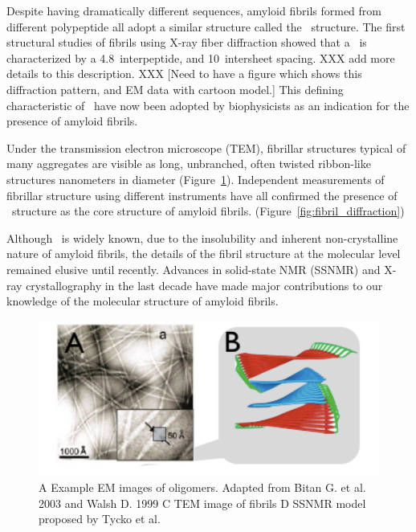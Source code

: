 
Despite having dramatically different sequences, amyloid fibrils formed from different polypeptide all adopt a similar structure called the \crossb\ structure.  The first structural studies of fibrils using X-ray fiber diffraction showed that a \crossb\ is characterized by a 4.8\angstrom\ interpeptide, and 10\angstrom\ intersheet spacing. XXX add more details to this description. XXX [Need to have a figure which shows this diffraction pattern, and EM data with cartoon model.] This defining characteristic of \crossb\ have now been adopted by biophysicists as an indication for the presence of amyloid fibrils.


Under the transmission electron microscope (TEM), fibrillar structures typical of many aggregates are visible as long, unbranched, often twisted ribbon-like structures nanometers in diameter (Figure~\ref{fig:fibril_TEM_SSNMR}). Independent measurements of fibrillar structure using different instruments have all confirmed the presence of \crossb\ structure as the core structure of amyloid fibrils. (Figure~\ref{fig:fibril_diffraction})


Although \crossb\ is widely known, due to the insolubility and inherent non-crystalline nature of amyloid fibrils, the details of the fibril structure at the molecular level remained elusive until recently. Advances in solid-state NMR (SSNMR) and X-ray crystallography in the last decade have made major contributions to our knowledge of the molecular structure of amyloid fibrils.

\begin{figure}
  \centering
  \includegraphics[width=6in]{figures/introduction/fibril_TEM_SSNMR.pdf}
  \caption[Characteristic cross-$\beta$ spacings from X-ray fibre diffraction studies of amyloid fibrils]{A Example EM images of oligomers.  Adapted from Bitan G. et al. 2003 and Walsh D. 1999 C TEM image of fibrils D SSNMR model proposed by Tycko et al.}
  \label{fig:fibril_TEM_SSNMR}
\end{figure}

